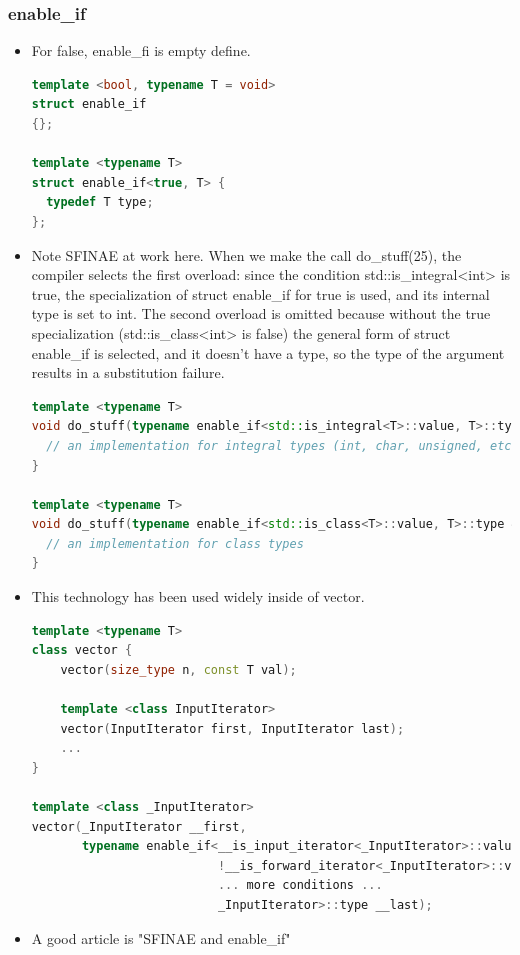 \documentclass[a4paper,12pt,twoside]{book}
\begin{document}
\subsubsection{enable\_if}
\begin{itemize}

\item For false, enable\_fi is empty define.
\begin{lstlisting}[frame=single, language=c++]
template <bool, typename T = void>
struct enable_if
{};

template <typename T>
struct enable_if<true, T> {
  typedef T type;
};
\end{lstlisting}

\item Note SFINAE at work here. When we make the call do\_stuff(25), the compiler selects the first overload: since the condition std::is\_integral<int> is true, the specialization of struct enable\_if for true is used, and its internal type is set to int. The second overload is omitted because without the true specialization (std::is\_class<int> is false) the general form of struct enable\_if is selected, and it doesn't have a type, so the type of the argument results in a substitution failure.

\begin{lstlisting}[frame=single, language=c++]
template <typename T>
void do_stuff(typename enable_if<std::is_integral<T>::value, T>::type &t) {
  // an implementation for integral types (int, char, unsigned, etc.)
}

template <typename T>
void do_stuff(typename enable_if<std::is_class<T>::value, T>::type &t) {
  // an implementation for class types
}
\end{lstlisting}

\item This technology has been used widely inside of vector.
\begin{lstlisting}[frame=single, language=c++]
template <typename T>
class vector {
    vector(size_type n, const T val);

    template <class InputIterator>
    vector(InputIterator first, InputIterator last);
    ...
}

template <class _InputIterator>
vector(_InputIterator __first,
       typename enable_if<__is_input_iterator<_InputIterator>::value &&
                          !__is_forward_iterator<_InputIterator>::value &&
                          ... more conditions ...
                          _InputIterator>::type __last);
\end{lstlisting}

\item A good article is "SFINAE and enable\_if"
\end{itemize}
\end{document}

